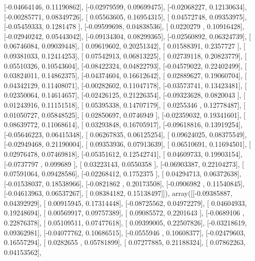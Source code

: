 \documentclass{article}
\begin{document}
       [-0.04664146,  0.11190862],
       [-0.02979599,  0.09699475],
       [-0.02068227,  0.12130634],
       [-0.00285771,  0.08349726],
       [ 0.05563605,  0.16954315],
       [ 0.04572748,  0.09353975],
       [-0.05459333,  0.1281478 ],
       [-0.09599698,  0.04838536],
       [ 0.0220279 ,  0.10916428],
       [-0.02940242,  0.05443042],
       [-0.09134304,  0.08299365],
       [-0.02560892,  0.06324739],
       [ 0.06746084,  0.09039448],
       [ 0.09619602,  0.20251342],
       [ 0.01588391,  0.2357727 ],
       [ 0.09381033,  0.12414253],
       [ 0.07542913,  0.06813225],
       [ 0.02739118,  0.20823779],
       [ 0.05510326,  0.10543604],
       [-0.08422324,  0.04822793],
       [-0.04579022,  0.22402499],
       [ 0.03824011,  0.14862375],
       [-0.04374604,  0.16612642],
       [ 0.02889627,  0.19060704],
       [ 0.04342129,  0.11408071],
       [-0.00282602,  0.11047178],
       [-0.03573741,  0.13423481],
       [ 0.02350064,  0.14614657],
       [-0.02426125,  0.21226354],
       [-0.09323628,  0.0820043 ],
       [ 0.01243916,  0.11151518],
       [ 0.05395338,  0.14707179],
       [ 0.0255346 ,  0.12778487],
       [ 0.01050727,  0.05848525],
       [ 0.02850697,  0.0746949 ],
       [-0.02359032,  0.19341601],
       [ 0.08639772,  0.11068614],
       [ 0.03293848,  0.16705917],
       [-0.09618816,  0.13919254],
       [-0.05646223,  0.06415348],
       [ 0.06267835,  0.06125254],
       [ 0.09624025,  0.08375549],
       [-0.02949468,  0.21190004],
       [ 0.09353936,  0.07913639],
       [ 0.06510691,  0.11694501],
       [ 0.02976478,  0.07469818],
       [-0.05351612,  0.12542741],
       [ 0.04609733,  0.19903154],
       [-0.0737797 ,  0.099689  ],
       [ 0.03223143,  0.0550358 ],
       [-0.06903387,  0.22104273],
       [ 0.07591064,  0.09428586],
       [-0.02268412,  0.1752375 ],
       [ 0.04294713,  0.06372638],
       [-0.01538037,  0.18538966],
       [-0.0821862 ,  0.20173508],
       [-0.0906982 ,  0.11540845],
       [-0.04613963,  0.06537267],
       [ 0.08384182,  0.15138497]]), array([[-0.09385887,  0.04392929],
       [ 0.00915945,  0.17314448],
       [-0.08725562,  0.04972279],
       [ 0.04604933,  0.19248694],
       [ 0.00569917,  0.09757389],
       [ 0.09085572,  0.2201643 ],
       [-0.0689106 ,  0.22876378],
       [ 0.05109511,  0.07477618],
       [ 0.09399005,  0.22507826],
       [-0.03218619,  0.09362981],
       [-0.04077762,  0.10686515],
       [-0.0555946 ,  0.10608377],
       [-0.02479603,  0.16557294],
       [ 0.0282655 ,  0.05781899],
       [ 0.07277885,  0.21188324],
       [ 0.07862263,  0.04153562],
\end{document}
